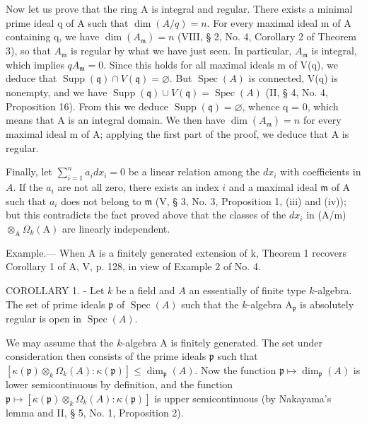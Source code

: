 Now let us prove that the ring A is integral and regular. There exists a minimal prime ideal q of A such that \(\dim(A/q) = n\). For every maximal ideal m of A containing q, we have \(\dim(A_{\mathfrak{m}}) = n\) (VIII, § 2, No. 4, Corollary 2 of Theorem 3), so that \(A_{\mathfrak{m}}\) is regular by what we have just seen. In particular, \(A_{\mathfrak{m}}\) is integral, which implies \(qA_{\mathfrak{m}} = 0\). Since this holds for all maximal ideals m of V(q), we deduce that \(\operatorname{Supp}(\mathfrak{q}) \cap V(\mathfrak{q}) = \varnothing\). But \(\operatorname{Spec}(A)\) is connected, V(q) is nonempty, and we have \(\operatorname{Supp}(\mathfrak{q}) \cup V(\mathfrak{q}) = \operatorname{Spec}(A)\) (II, § 4, No. 4, Proposition 16). From this we deduce \(\operatorname{Supp}(\mathfrak{q}) = \varnothing\), whence q = 0, which means that A is an integral domain. We then have \(\dim(A_{\mathfrak{m}}) = n\) for every maximal ideal m of A; applying the first part of the proof, we deduce that A is regular.

Finally, let \(\sum_{i=1}^{n} a_i dx_i = 0\) be a linear relation among the \(dx_i\) with coefficients in \(A\). If the \(a_i\) are not all zero, there exists an index \(i\) and a maximal ideal \(\mathfrak{m}\) of A such that \(a_i\) does not belong to \(\mathfrak{m}\) (V, § 3, No. 3, Proposition 1, (iii) and (iv)); but this contradicts the fact proved above that the classes of the \(dx_i\) in (A/m) \(\otimes_{\mathrm{A}} \Omega_k(\mathrm{A})\) are linearly independent.

Example.--- When A is a finitely generated extension of k, Theorem 1 recovers Corollary 1 of A, V, p. 128, in view of Example 2 of No. 4.

COROLLARY 1. - Let \(k\) be a field and \(A\) an essentially of finite type \(k\)-algebra. The set of prime ideals \(\mathfrak{p}\) of \(\operatorname{Spec}(A)\) such that the \(k\)-algebra \(\mathrm{A}_{\mathfrak{p}}\) is absolutely regular is open in \(\operatorname{Spec}(A)\).

We may assume that the \(k\)-algebra A is finitely generated. The set under consideration then consists of the prime ideals \(\mathfrak{p}\) such that \([\kappa(\mathfrak{p}) \otimes_k \Omega_k(A) : \kappa(\mathfrak{p})] \leqslant \dim_{\mathfrak{p}}(A)\). Now the function \(\mathfrak{p} \mapsto \dim_{\mathfrak{p}}(A)\) is lower semicontinuous by definition, and the function \(\mathfrak{p} \mapsto [\kappa(\mathfrak{p}) \otimes_k \Omega_k(A) : \kappa(\mathfrak{p})]\) is upper semicontinuous (by Nakayama's lemma and II, § 5, No. 1, Proposition 2).

